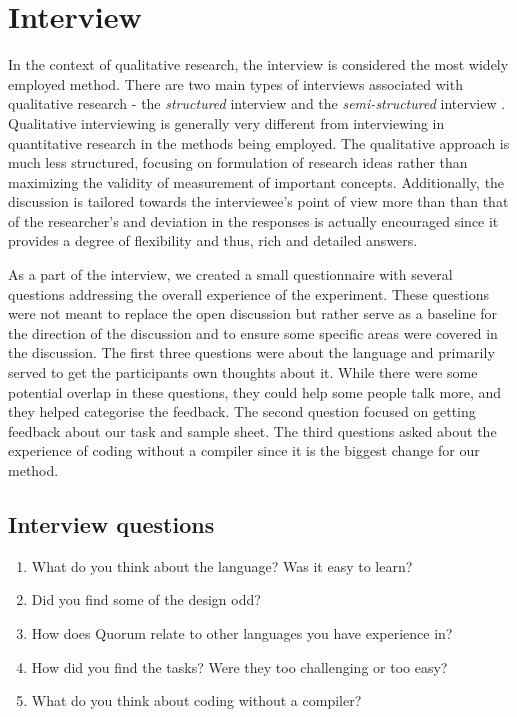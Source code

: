 \section{Interview}

In the context of qualitative research, the interview is considered the most widely employed method. There are two main types of interviews associated with qualitative research - the \textit{structured} interview and the \textit{semi-structured} interview . Qualitative interviewing is generally very different from  interviewing in quantitative research in the methods being employed. The qualitative approach is much less structured, focusing on formulation of research ideas rather than maximizing the validity of measurement of important concepts. Additionally, the discussion is tailored towards the interviewee's point of view more than than that of the researcher's and deviation in the responses is actually encouraged since it provides a degree of flexibility and thus, rich and detailed answers.

As a part of the interview, we created a small questionnaire with several questions addressing the overall experience of the experiment.
These questions were not meant to replace the open discussion but rather serve as a baseline for the direction of the discussion and to ensure some specific areas were covered in the discussion.
The first three questions were about the language and primarily served to get the participants own thoughts about it.
While there were some potential overlap in these questions, they could help some people talk more, and they helped categorise the feedback.
The second question focused on getting feedback about our task and sample sheet.
The third questions asked about the experience of coding without a compiler since it is the biggest change for our method.

\subsection{Interview questions}
\begin{enumerate}
\item What do you think about the language? Was it easy to learn?
\item Did you find some of the design odd?
\item How does Quorum relate to other languages you have experience in?
\item How did you find the tasks? Were they too challenging or too easy?
\item What do you think about coding without a compiler?
\end{enumerate}	